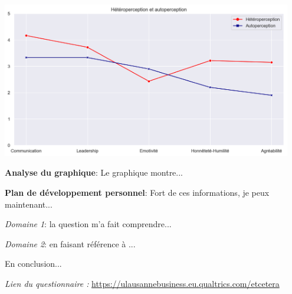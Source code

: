 



\linespread{1.1}
\setlength\parindent{0pt} %
\setlength{\parskip}{\baselineskip} %



\begin{center}
\includegraphics[width=0.95\textwidth]{graph.png}
\end{center}

\textbf{Analyse du graphique}: Le graphique montre... \lipsum[2]

\textbf{Plan de développement personnel}: Fort de ces informations, je peux maintenant... \lipsum[2]

\setlength\parindent{15pt}
\textit{Domaine 1}: la question  m'a fait comprendre... \lipsum[2]

\textit{Domaine 2}: en faisant référence à ... \lipsum[2]

En conclusion... \lipsum[2]

\textit{Lien du questionnaire : }\url{https://ulausannebusiness.eu.qualtrics.com/etcetera}

 
